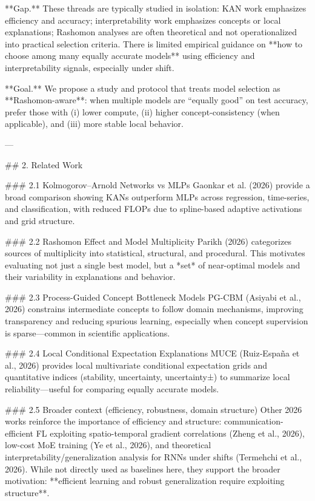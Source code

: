 **Gap.** These threads are typically studied in isolation: KAN work emphasizes efficiency and accuracy; interpretability work emphasizes concepts or local explanations; Rashomon analyses are often theoretical and not operationalized into practical selection criteria. There is limited empirical guidance on **how to choose among many equally accurate models** using efficiency and interpretability signals, especially under shift.

**Goal.** We propose a study and protocol that treats model selection as **Rashomon-aware**: when multiple models are “equally good” on test accuracy, prefer those with (i) lower compute, (ii) higher concept-consistency (when applicable), and (iii) more stable local behavior.

---

## 2. Related Work  

### 2.1 Kolmogorov–Arnold Networks vs MLPs  
Gaonkar et al. (2026) provide a broad comparison showing KANs outperform MLPs across regression, time-series, and classification, with reduced FLOPs due to spline-based adaptive activations and grid structure.

### 2.2 Rashomon Effect and Model Multiplicity  
Parikh (2026) categorizes sources of multiplicity into statistical, structural, and procedural. This motivates evaluating not just a single best model, but a *set* of near-optimal models and their variability in explanations and behavior.

### 2.3 Process-Guided Concept Bottleneck Models  
PG-CBM (Asiyabi et al., 2026) constrains intermediate concepts to follow domain mechanisms, improving transparency and reducing spurious learning, especially when concept supervision is sparse—common in scientific applications.

### 2.4 Local Conditional Expectation Explanations  
MUCE (Ruiz‑España et al., 2026) provides local multivariate conditional expectation grids and quantitative indices (stability, uncertainty, uncertainty±) to summarize local reliability—useful for comparing equally accurate models.

### 2.5 Broader context (efficiency, robustness, domain structure)  
Other 2026 works reinforce the importance of efficiency and structure: communication-efficient FL exploiting spatio-temporal gradient correlations (Zheng et al., 2026), low-cost MoE training (Ye et al., 2026), and theoretical interpretability/generalization analysis for RNNs under shifts (Termehchi et al., 2026). While not directly used as baselines here, they support the broader motivation: **efficient learning and robust generalization require exploiting structure**.

